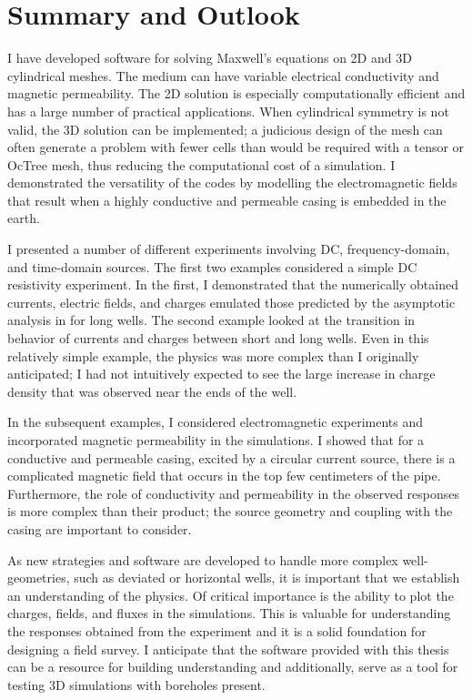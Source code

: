 \section{Summary and Outlook}

I have developed software for solving Maxwell's equations on 2D and 3D cylindrical meshes. The medium can have variable electrical conductivity and magnetic permeability. The 2D solution is especially computationally efficient and has a large number of practical applications. When cylindrical symmetry is not valid, the 3D solution can be implemented; a judicious design of the mesh can often generate a problem with fewer cells than would be required with a tensor or OcTree mesh, thus reducing the computational cost of a simulation. I demonstrated the versatility of the codes by modelling the electromagnetic fields that result when a highly conductive and permeable casing is embedded in the earth.

I presented a number of different experiments involving DC, frequency-domain, and time-domain sources. The first two examples considered a simple DC resistivity experiment. In the first, I demonstrated that the numerically obtained currents, electric fields, and charges emulated those predicted by the asymptotic analysis in \cite{Kaufman1990} for long wells. The second example looked at the transition in behavior of currents and charges between short and long wells. Even in this relatively simple example, the physics was more complex than I originally anticipated; I had not intuitively expected to see the large increase in charge density that was observed near the ends of the well.

In the subsequent examples, I considered electromagnetic experiments and incorporated magnetic permeability in the simulations. I showed that for a conductive and permeable casing, excited by a circular current source, there is a complicated magnetic field that occurs in the top few centimeters of the pipe. Furthermore, the role of conductivity and permeability in the observed responses is more complex than their product; the source geometry and coupling with the casing are important to consider.

As new strategies and software are developed to handle more complex well-geometries, such as deviated or horizontal wells, it is important that we establish an understanding of the physics. Of critical importance is the ability to plot the charges, fields, and fluxes in the simulations. This is valuable for understanding the responses obtained from the experiment and it is a solid foundation for designing a field survey. I anticipate that the software provided with this thesis can be a resource for building understanding and additionally, serve as a tool for testing 3D simulations with boreholes present.

